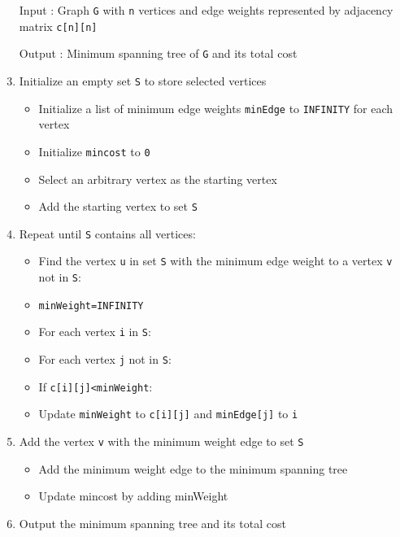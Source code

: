 \begin{enumerate}[label=Step \arabic* : ]
\item [Input : ] Graph \texttt{G} with \texttt{n} vertices and edge weights represented by adjacency matrix
	\texttt{c[n][n]}
\item [Output : ] Minimum spanning tree of \texttt{G} and its total cost

\item Initialize an empty set \texttt{S} to store selected vertices
	\begin{itemize}
		\item Initialize a list of minimum edge weights \texttt{minEdge} to \texttt{INFINITY} for each
			vertex
		\item Initialize \texttt{mincost} to \texttt{0}
		\item Select an arbitrary vertex as the starting vertex
		\item Add the starting vertex to set \texttt{S}
	\end{itemize}
\item Repeat until \texttt{S} contains all vertices:
	\begin{itemize}
		\item Find the vertex \texttt{u} in set \texttt{S} with the minimum edge weight to a vertex
			\texttt{v} not in \texttt{S}:
		\item \texttt{minWeight=INFINITY}
		\item For each vertex \texttt{i} in \texttt{S}:
		\item For each vertex \texttt{j} not in \texttt{S}:
		\item If \texttt{c[i][j]<minWeight}:
		\item Update \texttt{minWeight} to \texttt{c[i][j]} and \texttt{minEdge[j]} to \texttt{i}
	\end{itemize}
\item Add the vertex \texttt{v} with the minimum weight edge to set \texttt{S}
	\begin{itemize}
		\item Add the minimum weight edge to the minimum spanning tree
		\item Update mincost by adding minWeight
	\end{itemize}
\item Output the minimum spanning tree and its total cost
\end{enumerate}
